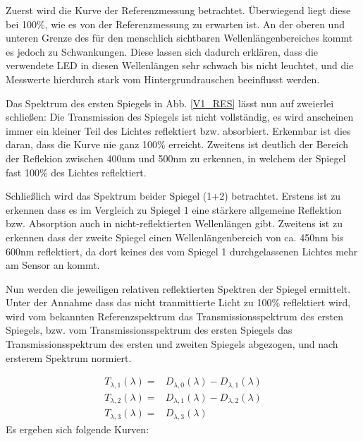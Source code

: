 \label{V1_AUSW}

Zuerst wird die Kurve der Referenzmessung betrachtet. Überwiegend liegt diese bei 100\%, wie es von der Referenzmessung zu erwarten ist. An der oberen und unteren Grenze des für den menschlich sichtbaren Wellenlängenbereiches kommt es jedoch zu Schwankungen. Diese lassen sich dadurch erklären, dass die verwendete LED in diesen Wellenlängen sehr schwach bis nicht leuchtet, und die Messwerte hierdurch stark vom Hintergrundrauschen beeinflusst werden. 

Das Spektrum des ersten Spiegels in Abb. \ref{V1_RES} lässt nun auf zweierlei schließen:
Die Transmission des Spiegels ist nicht vollständig, es wird anscheinen immer ein kleiner Teil des Lichtes reflektiert bzw. absorbiert. Erkennbar ist dies daran, dass die Kurve nie ganz 100\% erreicht. Zweitens ist deutlich der Bereich der Reflekion zwischen 400nm und 500nm zu erkennen, in welchem der Spiegel fast 100\% des Lichtes reflektiert. 

Schließlich wird das Spektrum beider Spiegel (1+2) betrachtet. Erstens ist zu erkennen dass es im Vergleich zu Spiegel 1 eine stärkere allgemeine Reflektion bzw. Absorption auch in nicht-reflektierten Wellenlängen gibt. Zweitens ist zu erkennen dass der zweite Spiegel einen Wellenlängenbereich von ca. 450nm bis 600nm reflektiert, da dort keines des vom Spiegel 1 durchgelassenen Lichtes mehr am Sensor an kommt.

Nun werden die jeweiligen relativen reflektierten Spektren der Spiegel ermittelt. Unter der Annahme dass das nicht tranmittierte Licht zu 100\% reflektiert wird, wird vom bekannten Referenzspektrum das Transmissionsspektrum des ersten Spiegels, bzw. vom Transmissionsspektrum des ersten Spiegels das Transmissionsspektrum des ersten und zweiten Spiegels abgezogen, und nach ersterem Spektrum normiert.

\begin{eqnarray}
	T_{\lambda, 1}(\lambda) = & D_{\lambda,0}(\lambda) - D_{\lambda,1}(\lambda) \\
	T_{\lambda, 2}(\lambda) = & D_{\lambda,1}(\lambda) - D_{\lambda,2}(\lambda) \\
	T_{\lambda, 3}(\lambda) = & D_{\lambda,3}(\lambda)
\end{eqnarray}
Es ergeben sich folgende Kurven:

